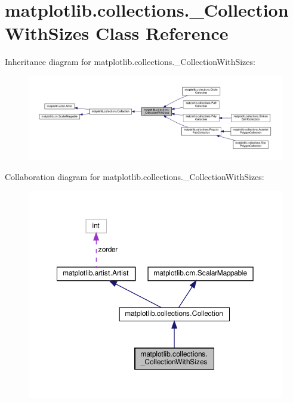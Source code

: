 \hypertarget{classmatplotlib_1_1collections_1_1__CollectionWithSizes}{}\section{matplotlib.\+collections.\+\_\+\+Collection\+With\+Sizes Class Reference}
\label{classmatplotlib_1_1collections_1_1__CollectionWithSizes}


Inheritance diagram for matplotlib.\+collections.\+\_\+\+Collection\+With\+Sizes\+:
\nopagebreak
\begin{figure}[H]
\begin{center}
\leavevmode
\includegraphics[width=350pt]{classmatplotlib_1_1collections_1_1__CollectionWithSizes__inherit__graph}
\end{center}
\end{figure}


Collaboration diagram for matplotlib.\+collections.\+\_\+\+Collection\+With\+Sizes\+:
\nopagebreak
\begin{figure}[H]
\begin{center}
\leavevmode
\includegraphics[width=350pt]{classmatplotlib_1_1collections_1_1__CollectionWithSizes__coll__graph}
\end{center}
\end{figure}
